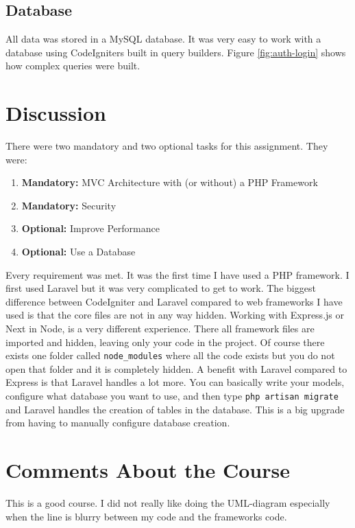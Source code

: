 \documentclass[a4paper]{scrartcl}
\begin{document}
\subsection{Database}
All data was stored in a MySQL database. It was very easy to work with a database using CodeIgniters built in query builders. Figure \ref{fig:auth-login} shows how complex queries were built.

\section{Discussion}

There were two mandatory and two optional tasks for this assignment. They were:

\begin{enumerate}
	\item \textbf{Mandatory:} MVC Architecture with (or without) a PHP Framework
	\item \textbf{Mandatory:} Security
	\item \textbf{Optional:} Improve Performance
	\item \textbf{Optional:} Use a Database
\end{enumerate}

\noindent
Every requirement was met. It was the first time I have used a PHP framework. I first used Laravel but it was very complicated to get to work. The biggest difference between CodeIgniter and Laravel compared to web frameworks I have used is that the core files are not in any way hidden. Working with Express.js or Next in Node, is a very different experience. There all framework files are imported and hidden, leaving only your code in the project. Of course there exists one folder called \texttt{node\_modules} where all the code exists but you do not open that folder and it is completely hidden. A benefit with Laravel compared to Express is that Laravel handles a lot more. You can basically write your models, configure what database you want to use, and then type \texttt{php artisan migrate} and Laravel handles the creation of tables in the database. This is a big upgrade from having to manually configure database creation.

\section{Comments About the Course}

This is a good course. I did not really like doing the UML-diagram especially when the line is blurry between my code and the frameworks code.

\printbibliography[heading=bibintoc]
\end{document}
